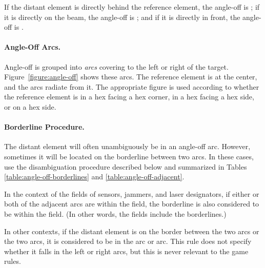 {If the distant element is directly behind the reference element, the angle-off is ; if it is directly on the beam, the angle-off is ; and if it is directly in front, the angle-off is .

\paragraph{Angle-Off Arcs.} 

Angle-off is grouped into \emph{arcs} covering  to the left or right of the target. Figure~\ref{figure:angle-off} shows these arcs. The reference element is at the center, and the arcs radiate from it. The appropriate figure is used according to whether the reference element is in a hex facing a hex corner, in a hex facing a hex side, or on a hex side.

\paragraph{Borderline Procedure.} 

The distant element will often unambiguously be in an angle-off arc. However, sometimes it will be located on the borderline between two arcs. In these cases, use the disambiguation procedure described below and summarized in Tables \ref{table:angle-off-borderlines} and \ref{table:angle-off-adjacent}.

In the context of the fields of sensors, jammers, and laser designators, if either or both of the adjacent arcs are within the field, the borderline is also considered to be within the field. (In other words, the fields include the borderlines.)

In other contexts, if the distant element is on the border between the two  arcs or the two  arcs, it is considered to be in the  arc or  arc. This rule does not specify whether it falls in the left or right arcs, but this is never relevant to the game rules. 


}

